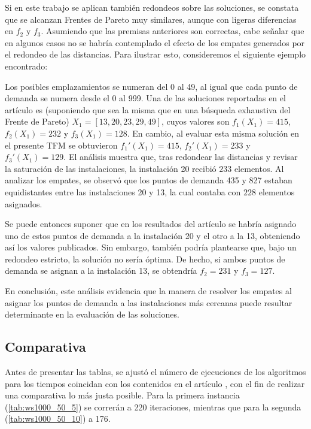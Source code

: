\documentclass[12pt,a4paper]{book}
\begin{document}
Si en este trabajo se aplican también redondeos sobre las soluciones, se constata que se alcanzan Frentes de Pareto muy similares, aunque con ligeras diferencias en $f_2$ y $f_3$. Asumiendo que las premisas anteriores son correctas, cabe señalar que en algunos casos no se habría contemplado el efecto de los empates generados por el redondeo de las distancias. Para ilustrar esto, consideremos el siguiente ejemplo encontrado:

Los posibles emplazamientos se numeran del 0 al 49, al igual que cada punto de demanda se numera desde el 0 al 999. Una de las soluciones reportadas en el artículo es (suponiendo que sea la misma que en una búsqueda exhaustiva del Frente de Pareto) $X_1 = [13, 20, 23, 29, 49]$, cuyos valores son $f_1(X_1) = 415$, $f_2(X_1) = 232$ y $f_3(X_1) = 128$. En cambio, al evaluar esta misma solución en el presente TFM se obtuvieron $f_1'(X_1) = 415$, $f_2'(X_1) = 233$ y $f_3'(X_1) = 129$.
El análisis muestra que, tras redondear las distancias y revisar la saturación de las instalaciones, la instalación 20 recibió $233$ elementos. Al analizar los empates, se observó que los puntos de demanda 435 y 827 estaban equidistantes entre las instalaciones 20 y 13, la cual contaba con $228$ elementos asignados.

Se puede entonces suponer que en los resultados del artículo se habría asignado uno de estos puntos de demanda a la instalación 20 y el otro a la 13, obteniendo así los valores publicados. Sin embargo, también podría plantearse que, bajo un redondeo estricto, la solución no sería óptima.
De hecho, si ambos puntos de demanda se asignan a la instalación 13, se obtendría $f_2 = 231$ y $f_3 = 127$.

En conclusión, este análisis evidencia que la manera de resolver los empates al asignar los puntos de demanda a las instalaciones más cercanas puede resultar determinante en la evaluación de las soluciones.

\subsection{Comparativa}

Antes de presentar las tablas, se ajustó el número de ejecuciones de los algoritmos para los tiempos coincidan con los contenidos en el artículo \cite{k-balanced_1}, con el fin de realizar una comparativa lo más justa posible. Para la primera instancia (\ref{tab:ws1000_50_5}) se correrán a 220 iteraciones, mientras que para la segunda (\ref{tab:ws1000_50_10}) a 176.
\end{document}
